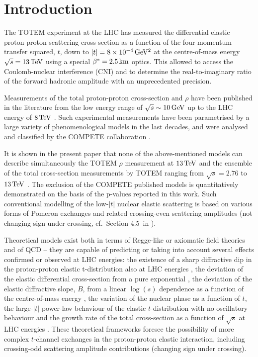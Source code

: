 \section{Introduction}
\label{sec:introduction}

The TOTEM experiment at the LHC has measured the differential elastic proton-proton scattering cross-section as a function of the four-momentum transfer squared, $t$, down to $|t| = 8\times10^{-4}\,{\rm GeV^2}$ at the centre-of-mass energy $\sqrt s = 13\,{\rm TeV}$ using a special $\beta^* = 2.5\,{\rm km}$ optics. This allowed to access the Coulomb-nuclear interference (CNI) and to determine the real-to-imaginary ratio of the forward hadronic amplitude with an unprecedented precision.

Measurements of the total proton-proton cross-section and $\rho$ have been published in the literature from the low energy range of $\sqrt s \sim 10\,{\rm GeV}$ up to the LHC energy of $8\,{\rm TeV}$ \cite{pdg-2016}. Such experimental measurements have been parametrised by a large variety of phenomenological models in the last decades, and were analysed and classified by the COMPETE collaboration \cite{compete}.

It is shown in the present paper that none of the above-mentioned models can describe simultaneously the TOTEM $\rho$ measurement at $13\,{\rm TeV}$ and the ensemble of the total cross-section measurements by TOTEM ranging from $\sqrt s = 2.76$ to $13\,{\rm TeV}$ \cite{totem-7tev-tot2,totem-8tev-90m,totem-8tev-1km,totem-13tev-90m}. The exclusion of the COMPETE published models is quantitatively demonstrated on the basis of the p-values reported in this work. Such conventional modelling of the low-$|t|$ nuclear elastic scattering is based on various forms of Pomeron exchanges and related crossing-even scattering amplitudes (not changing sign under crossing, cf.~Section 4.5~in \cite{barone-predazzi}).

Theoretical models exist both in terms of Regge-like or axiomatic field theories \cite{nicolescu-1992} and of QCD \cite{bartels-1980,kwiecinski-1980,jaroszewicz-1981} -- they are capable of predicting or taking into account several effects confirmed or observed at LHC energies: the existence of a sharp diffractive dip in the proton-proton elastic t-distribution also at LHC energies \cite{totem-7tev-first}, the deviation of the elastic differential cross-section from a pure exponential \cite{totem-8tev-90m}, the deviation of the elastic diffractive slope, $B$, from a linear $\log(s)$ dependence as a function of the centre-of-mass energy \cite{totem-13tev-90m}, the variation of the nuclear phase as a function of $t$, the large-$|t|$ power-law behaviour of the elastic $t$-distribution with no oscillatory behaviour and the growth rate of the total cross-section as a function of $\sqrt s$ at LHC energies \cite{totem-13tev-90m}. These theoretical frameworks foresee the possibility of more complex $t$-channel exchanges in the proton-proton elastic interaction, including crossing-odd scattering amplitude contributions (changing sign under crossing).

